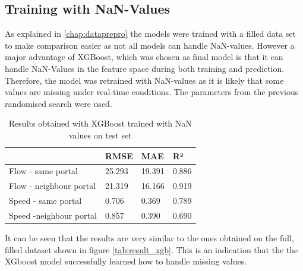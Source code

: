 	\subsection{Training with NaN-Values} \label{chap:nan}
	As explained in \ref{chap:dataprepro} the models were trained with a filled data set to make comparison easier as not all models can handle NaN-values. 
	However a major advantage of XGBoost, which was chosen as final model is that it can handle NaN-Values in the feature space during both training and prediction. 
	Therefore, the model was retrained with NaN-values as it is likely that some values are missing under real-time conditions. The parameters from the previous randomised search were used.
	\begin{table}[H]
		\centering
		\caption{Results obtained with XGBoost trained with NaN values on test set}
		\label{tab:result_xgb_nan}
		\begin{tabular}{l|lll}
			& RMSE   & MAE    & R²    \\
			\hline
			Flow - same portal      &25.293& 19.391& 0.886\\
			Flow - neighbour portal &  21.319& 16.166& 0.919\\
			Speed - same portal     & 0.706 & 0.369& 0.789\\
			Speed -neighbour portal &0.857& 0.390& 0.690
		\end{tabular}
	\end{table}
	\noindent It can be seen that the results are very similar to the ones obtained on the full, filled dataset shown in figure \ref{tab:result_xgb}. This is an indication that the the XGboost model successfully learned how to handle missing values.
